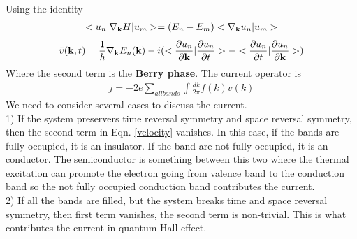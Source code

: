 \documentclass[a4paper]{article}
\begin{document}
Using the identity
\begin{align*}
	<u_n|\nabla_{\bf k} H | u_m> = (E_n - E_m) < \nabla_{\bf k} u_n| u_m>
\end{align*}
\begin{align}\label{velocity}
	\bar v({\bf k},t) = \frac{1}{\hbar} \nabla_{\bf k} E_n({\bf k}) 
	- i  (<\frac{\partial u_n}{\partial {\bf k}}| \frac{\partial u_n}{\partial t}> -<\frac{\partial u_n}{\partial t}| \frac{\partial u_n}{\partial {\bf k}}>)
\end{align}
Where the second term is the {\bf Berry phase}.
The current operator is
\begin{align*}
	j = -2e\sum_{all bands}\int\frac{dk}{2 \pi} f(k)v(k)
\end{align*}
We need to consider several cases to discuss the current.\\
1) If the system preservers time reversal symmetry and space reversal symmetry, then the second term in Eqn. \ref{velocity} vanishes. In this case, if the bands are fully occupied, it is an insulator. If the band are not fully occupied, it is an conductor. The semiconductor is something between this two where the thermal excitation can promote the electron going from valence band to the conduction band so the not fully occupied conduction band contributes the current.\\
2) If all the bands are filled, but the system breaks time and space reversal symmetry, then first term vanishes, the second term is non-trivial. This is what contributes the current in quantum Hall effect.\\
\end{document}
